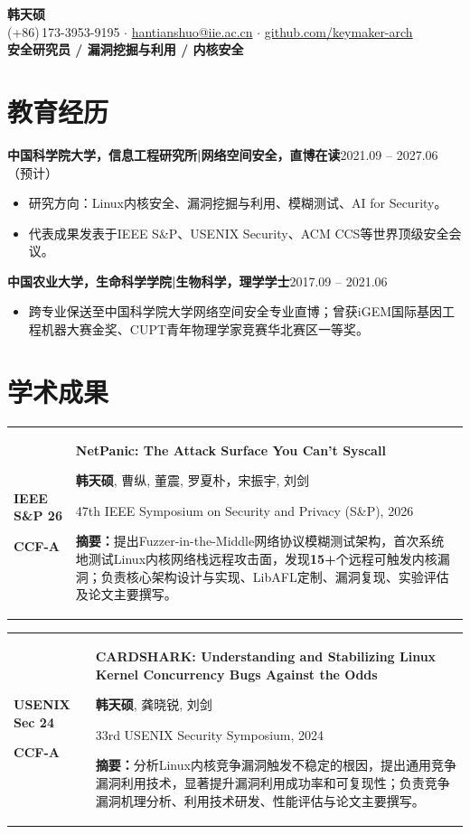 \documentclass[10pt, a4paper]{article}
\makeatletter
\newcommand{\resumeentry}[2]{%
  \noindent\textbf{#1}\hfill #2\par\vspace{1pt}
}
\newcommand{\sectionicon}[2]{%
  \section{\texorpdfstring{\textcolor{accent}{#1}\enspace #2}{#2}}%
}
\newcommand{\pubstatus}[1]{%
  \if\relax\detokenize{#1}\relax
  \else
    \par{\footnotesize\color{muted}#1}%
  \fi
}
\newcommand{\pubentry}[7]{%
  \par\addvspace{4pt}%
  \noindent
  \begin{tabularx}{\textwidth}{@{}p{1.12in}@{\hspace{0.10in}}>{\raggedright\arraybackslash}X@{}}
    {\raggedright\small\textbf{#1}\par
     \textcolor{rankred}{\textbf{#2}}%
     \pubstatus{#3}} &
    {\textbf{#4}\par
     {\small #5\par}
     {\small\color{muted}#6\par}
     {\small\textbf{摘要：}#7\par}}%
  \end{tabularx}\par
}
\makeatother
\begin{document}
\begin{center}
  {\LARGE\bfseries 韩天硕}\\[3pt]
  {\small
  \textcolor{accent}{}\enspace (+86)\,173-3953-9195 \enspace$\cdot$\enspace
  \textcolor{accent}{}\enspace \href{mailto:hantianshuo@iie.ac.cn}{hantianshuo@iie.ac.cn} \enspace$\cdot$\enspace
  \textcolor{accent}{\faGithub}\enspace
  \href{https://github.com/keymaker-arch}{github.com/keymaker-arch}}\\[4pt]
  {\normalsize\bfseries 安全研究员  / 漏洞挖掘与利用 / 内核安全 }
\end{center}

\vspace{-7pt}

\sectionicon{}{教育经历}

\resumeentry{中国科学院大学，信息工程研究所\enspace|\enspace 网络空间安全，直博在读}{2021.09 -- 2027.06（预计）}
\begin{itemize}
  \item 研究方向：Linux内核安全、漏洞挖掘与利用、模糊测试、AI for Security。
  \item 代表成果发表于IEEE S\&P、USENIX Security、ACM CCS等世界顶级安全会议。
\end{itemize}

\resumeentry{中国农业大学，生命科学学院\enspace|\enspace 生物科学，理学学士}{2017.09 -- 2021.06}
\begin{itemize}
  \item 跨专业保送至中国科学院大学网络空间安全专业直博；曾获iGEM国际基因工程机器大赛金奖、CUPT青年物理学家竞赛华北赛区一等奖。
\end{itemize}

\sectionicon{}{学术成果}

\pubentry
{IEEE S\&P 26}{CCF-A}{}
{NetPanic: The Attack Surface You Can't Syscall}
{\textbf{韩天硕}, 曹纵, 董震, 罗夏朴，宋振宇, 刘剑}
{47th IEEE Symposium on Security and Privacy (S\&P), 2026}
{提出Fuzzer-in-the-Middle网络协议模糊测试架构，首次系统地测试Linux内核网络栈远程攻击面，发现\textbf{15+}个远程可触发内核漏洞；负责核心架构设计与实现、LibAFL定制、漏洞复现、实验评估及论文主要撰写。}

\pubentry
{USENIX Sec 24}{CCF-A}{}
{CARDSHARK: Understanding and Stabilizing Linux Kernel Concurrency Bugs Against the Odds}
{\textbf{韩天硕}, 龚晓锐, 刘剑}
{33rd USENIX Security Symposium, 2024}
{分析Linux内核竞争漏洞触发不稳定的根因，提出通用竞争漏洞利用技术，显著提升漏洞利用成功率和可复现性；负责竞争漏洞机理分析、利用技术研发、性能评估与论文主要撰写。}
\end{document}

